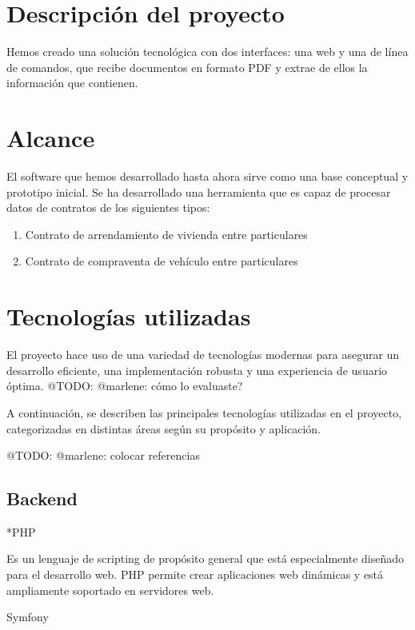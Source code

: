 \section{Descripción del proyecto}

Hemos creado una solución tecnológica con dos interfaces: una web y una de línea de comandos, que recibe documentos
en formato PDF y extrae de ellos la información que contienen.


\section{Alcance}

El software que hemos desarrollado hasta ahora sirve como una base conceptual y prototipo inicial.
Se ha desarrollado una herramienta que es capaz de procesar datos de contratos de los siguientes tipos:

\begin{enumerate}
    \item Contrato de arrendamiento de vivienda entre particulares
    \item Contrato de compraventa de vehículo entre particulares
\end{enumerate}


\section{Tecnologías utilizadas}
El proyecto hace uso de una variedad de tecnologías modernas para asegurar un desarrollo eficiente,
una implementación robusta y una experiencia de usuario óptima.
\colorbox{color_highlight}{@TODO: @marlene:} cómo lo evaluaste?

A continuación, se describen las principales tecnologías utilizadas en
el proyecto, categorizadas en distintas áreas según su propósito y aplicación.

\colorbox{color_highlight}{@TODO: @marlene:} colocar referencias

\subsection*{Backend}

*PHP

Es un lenguaje de scripting de propósito general que está especialmente diseñado para el desarrollo web.
PHP permite crear aplicaciones web dinámicas y está ampliamente soportado en servidores web.

Symfony

